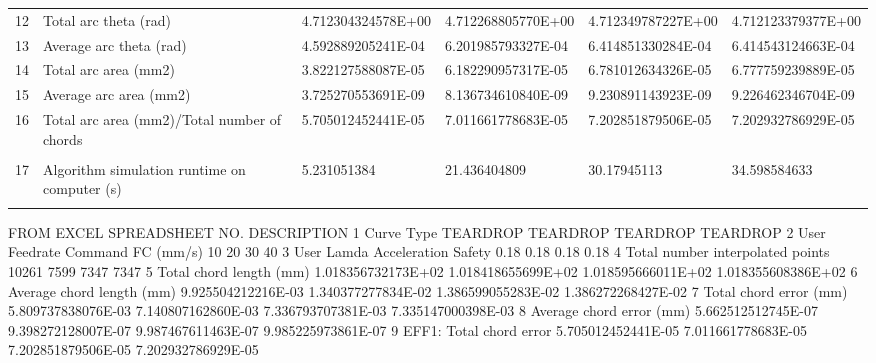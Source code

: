 \begin{tabular}{ p{0.5cm} p{8.0cm} p{4.00cm} p{4.0cm} p{4.00cm} p{4.0cm}}
12	& Total arc theta (rad)	                               & 4.712304324578E+00	& 4.712268805770E+00 & 4.712349787227E+00 & 4.712123379377E+00 \\
13	& Average arc theta (rad)	                           & 4.592889205241E-04	& 6.201985793327E-04 & 6.414851330284E-04 & 6.414543124663E-04 \\
14	& Total arc area (mm2)	                               & 3.822127588087E-05	& 6.182290957317E-05 & 6.781012634326E-05 & 6.777759239889E-05 \\
15	& Average arc area (mm2)	                           & 3.725270553691E-09	& 8.136734610840E-09 & 9.230891143923E-09 & 9.226462346704E-09 \\
16	& Total arc area (mm2)/Total number of chords	       & 5.705012452441E-05	& 7.011661778683E-05 & 7.202851879506E-05 & 7.202932786929E-05 \\
	&                                                      &                    &                      &                    & \\
17	& Algorithm simulation runtime on computer (s)         & 5.231051384	    & 21.436404809	       & 30.17945113	    & 34.598584633\\
	&                                                      &                    &                      &                    & 
\end{tabular}


FROM EXCEL SPREADSHEET
NO.	DESCRIPTION				
1	Curve Type	                     TEARDROP	        TEARDROP	      TEARDROP	          TEARDROP
2	User Feedrate Command FC (mm/s)	     10	              20	             30         	    40
3	User Lamda Acceleration Safety  	0.18	         0.18	            0.18	            0.18
4	Total number interpolated points	10261	         7599	             7347	           7347
5	Total chord length (mm)	    1.018356732173E+02	1.018418655699E+02	1.018595666011E+02	1.018355608386E+02
6	Average chord length (mm)	9.925504212216E-03	1.340377277834E-02	1.386599055283E-02	1.386272268427E-02
7	Total chord error (mm)	    5.809737838076E-03	7.140807162860E-03	7.336793707381E-03	7.335147000398E-03
8	Average chord error (mm)	5.662512512745E-07	9.398272128007E-07	9.987467611463E-07	9.985225973861E-07
9	EFF1: Total chord error  	5.705012452441E-05	7.011661778683E-05	7.202851879506E-05	7.202932786929E-05

